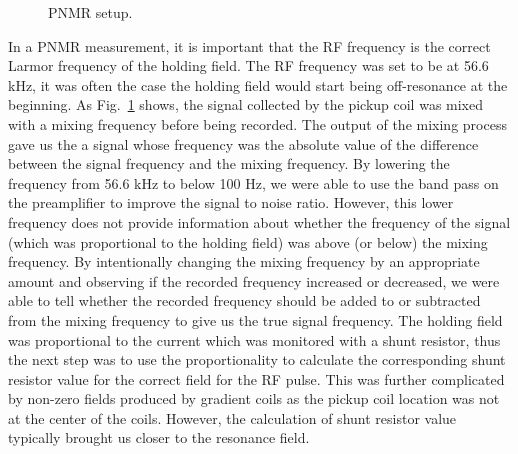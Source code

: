 \begin{figure}[t!]
	\centering
	\caption{{ PNMR setup.}}
	\label{PNMR_setup}
\end{figure}

In a PNMR measurement, it is important that the RF frequency is the correct Larmor frequency of the holding field. The RF frequency was set to be at 56.6 kHz, it was often the case the holding field would start being off-resonance at the beginning.  As Fig.~\ref{PNMR_setup} shows, the signal collected by the pickup coil was mixed with a mixing frequency before being recorded. The output of the mixing process gave us the a signal whose frequency was the absolute value of the difference between the signal frequency and the mixing frequency. By lowering the frequency from 56.6 kHz to below 100 Hz, we were able to use the band pass on the preamplifier to improve the signal to noise ratio. However, this lower frequency does not provide information about whether the frequency of the signal (which was proportional to the holding field) was above (or below) the mixing frequency. By intentionally changing the mixing frequency by an appropriate amount and observing if the recorded frequency increased or decreased, we were able to tell whether the recorded frequency should be added to or subtracted from the mixing frequency to give us the true signal frequency. The holding field was proportional to the current which was monitored with a shunt resistor, thus the next step was to use the proportionality to calculate the corresponding shunt resistor value for the correct field for the RF pulse. This was further complicated by non-zero fields produced by gradient coils as the pickup coil location was not at the center of the coils. However, the calculation of shunt resistor value typically brought us closer to the resonance field. 

